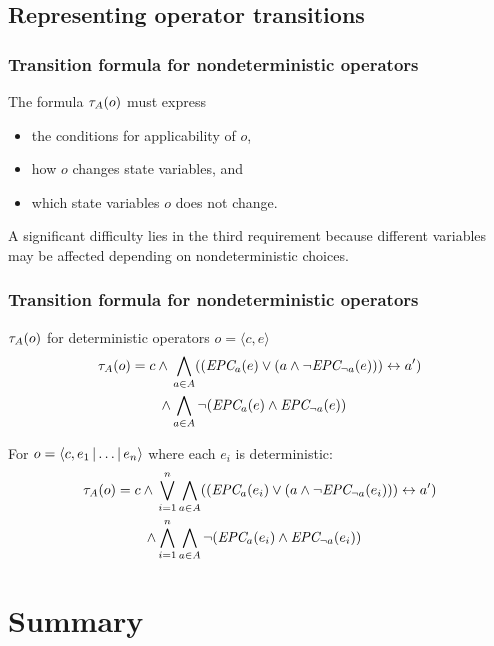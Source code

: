 \documentclass{gkibeamer}
\begin{document}
\subsection[Transitions]{Representing operator transitions}

\begin{frame}
  \frametitle{Transition formula for nondeterministic operators}

  The formula $\tau_{A}(o)$ must express
  \begin{itemize}
  \item the conditions for applicability of $o$,
  \item how $o$ \alert{changes} state variables, and
  \item which state variables $o$ \alert{does not change}.
  \end{itemize}
  
  A significant difficulty lies in the third requirement because
  \alert{different variables} may be affected depending on
  nondeterministic choices.
\end{frame}


\begin{frame}
  \frametitle{Transition formula for nondeterministic operators}

  \begin{block}{$\tau_{A}(o)$ for deterministic operators
      $o = \langle c, e\rangle$}
    \begin{align*}
      \tau_{A}(o) = c \land{}
      & \bigwedge_{a \in A} ((\textit{EPC}_{a}(e) \lor
      (a \land \neg \textit{EPC}_{\neg a}(e))) \leftrightarrow a') \\
      \land & \bigwedge_{a \in A} \neg
      (\textit{EPC}_{a}(e) \land \textit{EPC}_{\neg a}(e))
    \end{align*}
  \end{block}

  For $o = \langle c, e_1 \mathop{|} \dots \mathop{|} e_n\rangle$
  where each $e_i$ is deterministic:
  \begin{align*}
    \tau_{A}(o) = c \land{}
    & \bigvee_{i=1}^n \bigwedge_{a \in A} ((\textit{EPC}_{a}(e_i) \lor
    (a \land \neg \textit{EPC}_{\neg a}(e_i))) \leftrightarrow a') \\
    \land & \bigwedge_{i=1}^n \bigwedge_{a \in A} \neg
    (\textit{EPC}_{a}(e_i) \land \textit{EPC}_{\neg a}(e_i))
  \end{align*}
\end{frame}


\section{Summary}
\end{document}
